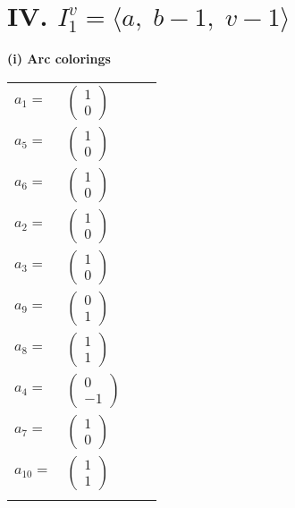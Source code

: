 \documentclass[1p]{elsarticle_modified}
\theoremstyle{definition}
\begin{document}
\centering \section*{IV. $I^v_{1}= \langle a,\;b-1,\;v-1 \rangle$}
\flushleft \textbf{(i) Arc colorings}\\
\begin{tabular}{m{7pt} m{180pt} m{7pt} m{180pt} }
\flushright $a_{1}=$&$\begin{pmatrix}1\\0\end{pmatrix}$ \\
\flushright $a_{5}=$&$\begin{pmatrix}1\\0\end{pmatrix}$ \\
\flushright $a_{6}=$&$\begin{pmatrix}1\\0\end{pmatrix}$ \\
\flushright $a_{2}=$&$\begin{pmatrix}1\\0\end{pmatrix}$ \\
\flushright $a_{3}=$&$\begin{pmatrix}1\\0\end{pmatrix}$ \\
\flushright $a_{9}=$&$\begin{pmatrix}0\\1\end{pmatrix}$ \\
\flushright $a_{8}=$&$\begin{pmatrix}1\\1\end{pmatrix}$ \\
\flushright $a_{4}=$&$\begin{pmatrix}0\\-1\end{pmatrix}$ \\
\flushright $a_{7}=$&$\begin{pmatrix}1\\0\end{pmatrix}$ \\
\flushright $a_{10}=$&$\begin{pmatrix}1\\1\end{pmatrix}$\\&\end{tabular}
\end{document}
